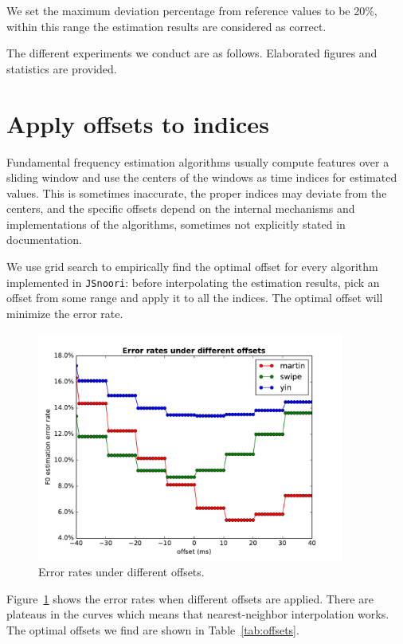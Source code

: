 \documentclass[11pt,a4paper]{report}
\begin{document}
We set the maximum deviation percentage from reference values to be 20\%, within this range the estimation results are considered as correct.

The different experiments we conduct are as follows.
Elaborated figures and statistics are provided.

\newpage

\section{Apply offsets to indices}

Fundamental frequency estimation algorithms usually compute features over a sliding window and use the centers of the windows as time indices for estimated values.
This is sometimes inaccurate, the proper indices may deviate from the centers, and the specific offsets depend on the internal mechanisms and implementations of the algorithms, sometimes not explicitly stated in documentation.

We use grid search to empirically find the optimal offset for every algorithm implemented in \texttt{JSnoori}: before interpolating the estimation results, pick an offset from some range and apply it to all the indices.
The optimal offset will minimize the error rate.

\begin{figure}[htbp]
  \centering
  \includegraphics[width=0.9\textwidth]{error_rates_vs_offsets.pdf}
  \caption{Error rates under different offsets.} \label{fig:offsets}
\end{figure}

Figure~\ref{fig:offsets} shows the error rates when different offsets are applied.
There are plateaus in the curves which means that nearest-neighbor interpolation works.
The optimal offsets we find are shown in Table~\ref{tab:offsets}.
\end{document}
